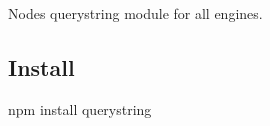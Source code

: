 \href{http://travis-ci.org/mike-spainhower/querystring}{\tt }

\href{http://ci.testling.com/mike-spainhower/querystring}{\tt }

Node\textquotesingle{}s querystring module for all engines.

\subsection*{Install}

\begin{DoxyVerb}npm install querystring\end{DoxyVerb}
 